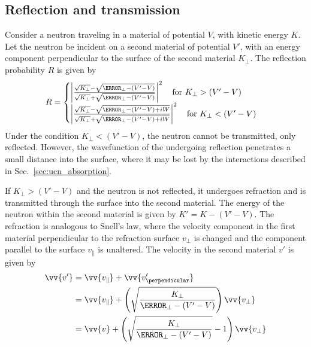 
\subsection{Reflection and transmission}\label{sec:ucn_reflection_transmission}


Consider a neutron traveling in a material of potential $V$, with kinetic energy $K$. Let the neutron be incident on a second material of potential $V'$, with an energy component perpendicular to the surface of the second material $K_\perp$. The reflection probability $R$ is given by~\cite{golubUCN,schreyer_pentrack}
%
\begin{gather}
    R = \begin{cases}
        \left| \frac{\sqrt{K_\perp}-\sqrt{\K_\perp - (V'-V)}}{\sqrt{K_\perp} + \sqrt{\K_\perp - (V'-V)}}\right|^2 \quad \text{for } K_\perp > (V'-V) \\
        \left| \frac{\sqrt{K_\perp}-\sqrt{\K_\perp - (V'-V) + iW}}{\sqrt{K_\perp} + \sqrt{\K_\perp - (V'-V) + iW}} \right|^2 \quad \text{for } K_\perp < (V'-V)
    \end{cases}
\end{gather}
%
Under the condition $K_\perp < (V'-V)$, the neutron cannot be transmitted, only reflected. However, the wavefunction of the \ucn undergoing reflection penetrates a small distance into the surface, where it may be lost by the interactions described in Sec.~\ref{sec:ucn_absorption}.

If $K_\perp > (V'-V)$ and the neutron is not reflected, it undergoes refraction and is transmitted through the surface into the second material. The energy of the neutron within the second material is given by $K'=K-(V'-V)$. The refraction is analogous to Snell's law, where the velocity component in the first material perpendicular to the refraction surface $v_\perp$ is changed and the component parallel to the surface $v_\parallel$ is unaltered. The velocity in the second material $v'$ is given by
%
\begin{align}
    \vv{v'} &= \vv{v_\parallel}+ \vv{v'_\perpendicular} \\
    &= \vv{v_\parallel} + \left( \sqrt{\frac{K_\perp}{\K_\perp - (V'-V)}} \right)\vv{v_\perp} \\
    &= \vv{v} + \left( \sqrt{\frac{K_\perp}{\K_\perp - (V'-V)}} - 1 \right)\vv{v_\perp}
\end{align}

